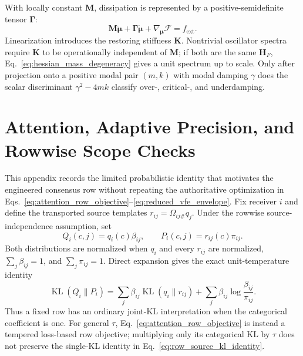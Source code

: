 \documentclass[12pt]{article}
\newcommand{\KL}{\operatorname{KL}}
\begin{document}
With locally constant $\mathbf M$, dissipation is represented by a positive-semidefinite tensor $\boldsymbol\Gamma$:
\begin{equation}
\boxed{
\mathbf M\ddot{\boldsymbol\mu}
+\boldsymbol\Gamma\dot{\boldsymbol\mu}
+\nabla_{\boldsymbol\mu}\mathcal F
=f_{\mathrm{ext}}.}
\label{eq:damped_dynamics}
\end{equation}
Linearization introduces the restoring stiffness $\mathbf K$.  Nontrivial oscillator spectra require $\mathbf K$ to be operationally independent of $\mathbf M$; if both are the same $\mathbf H_F$, Eq.~\eqref{eq:hessian_mass_degeneracy} gives a unit spectrum up to scale.  Only after projection onto a positive modal pair $(m,k)$ with modal damping $\gamma$ does the scalar discriminant $\gamma^2-4mk$ classify over-, critical-, and underdamping.

\section{Attention, Adaptive Precision, and Rowwise Scope Checks}
\label{app:social_coupling}

This appendix records the limited probabilistic identity that motivates the engineered consensus row without repeating the authoritative optimization in Eqs.~\eqref{eq:attention_row_objective}--\eqref{eq:reduced_vfe_envelope}. Fix receiver $i$ and define the transported source templates $r_{ij}=\Omega_{ij\#}q_j$. Under the rowwise source-independence assumption, set
\begin{equation}
Q_i(c,j)=q_i(c)\beta_{ij},
\qquad
P_i(c,j)=r_{ij}(c)\pi_{ij}.
\label{eq:row_source_models}
\end{equation}
Both distributions are normalized when $q_i$ and every $r_{ij}$ are normalized, $\sum_j\beta_{ij}=1$, and $\sum_j\pi_{ij}=1$. Direct expansion gives the exact unit-temperature identity
\begin{equation}
\KL(Q_i\|P_i)
=\sum_j\beta_{ij}\KL(q_i\|r_{ij})
+\sum_j\beta_{ij}\log\frac{\beta_{ij}}{\pi_{ij}}.
\label{eq:row_source_kl_identity}
\end{equation}
Thus a fixed row has an ordinary joint-KL interpretation when the categorical coefficient is one. For general $\tau$, Eq.~\eqref{eq:attention_row_objective} is instead a tempered loss-based row objective; multiplying only its categorical KL by $\tau$ does not preserve the single-KL identity in Eq.~\eqref{eq:row_source_kl_identity}.
\end{document}

